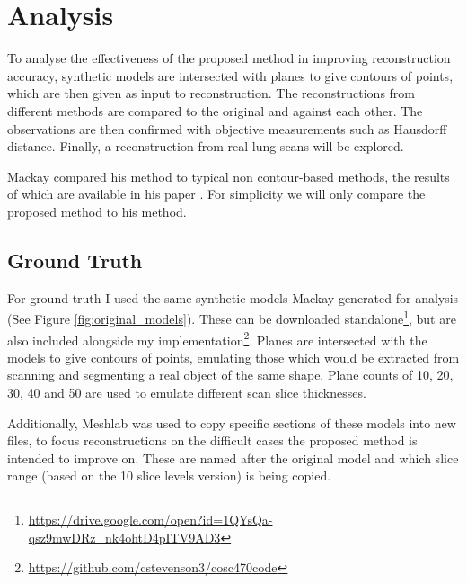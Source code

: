\documentclass[11p, titlepage]{article}
\begin{document}
\section{Analysis}

To analyse the effectiveness of the proposed method in improving reconstruction accuracy, synthetic models are intersected with planes to give contours of points, which are then given as input to reconstruction. The reconstructions from different methods are compared to the original and against each other. The observations are then confirmed with objective measurements such as Hausdorff distance. Finally, a reconstruction from real lung scans will be explored.

Mackay compared his method to typical non contour-based methods, the results of which are available in his paper \cite{mackay2019robust}. For simplicity we will only compare the proposed method to his method.

\subsection{Ground Truth}

For ground truth I used the same synthetic models Mackay generated for analysis (See Figure \ref{fig:original_models}). These can be downloaded standalone\footnote{\url{https://drive.google.com/open?id=1QYsQa-qsz9mwDRz_nk4ohtD4pITV9AD3}}, but are also included alongside my implementation\footnote{\url{https://github.com/cstevenson3/cosc470code}}. Planes are intersected with the models to give contours of points, emulating those which would be extracted from scanning and segmenting a real object of the same shape. Plane counts of 10, 20, 30, 40 and 50 are used to emulate different scan slice thicknesses.

Additionally, Meshlab was used to copy specific sections of these models into new files, to focus reconstructions on the difficult cases the proposed method is intended to improve on. These are named after the original model and which slice range (based on the 10 slice levels version) is being copied.
\end{document}
